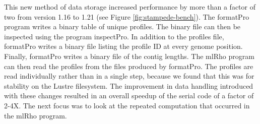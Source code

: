 \documentclass{sig-alternate}
\begin{document}
This new method of data storage increased performance by more than a factor of two from version
1.16 to 1.21 (see Figure \ref{fig:stampede-bench}). The formatPro program writes a binary table of unique
profiles.
The binary file can then be inspected using the program inspectPro.
In addition to the profiles file, formatPro writes a binary file
listing the profile ID at every genome position.
Finally, formatPro writes a binary file of the contig lengths.
The mlRho program can then read the profiles from the files produced by formatPro.
The profiles are read individually rather than in a single
step, because we found that this was for stability on the Lustre filesystem.
 The improvement in data handling introduced with these changes resulted in an overall speedup of the
serial code of a factor of 2-4X. The next focus was to look at the repeated computation that occurred in the
mlRho program. 
\end{document}
